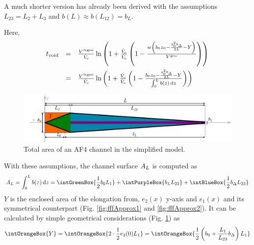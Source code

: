 A much shorter version has already been derived  with the assumptions $L_{23} = L_2 
+ L_3$ and $b(L) \approx b(L_{12}) = b_L$.

Here, 
\begin{equation}
\begin{array}{lll}
\tvoid &= & \frac{\Vappgeo}{\Vc} \ln{
  \left(
  1 + \frac{\Vc}{\Ve}
  \left(
  1 - \frac{
    w 
    \left(
    b_0 z_0 
    - \frac{
      z_0^2 \bDelta
    }{
      2L} 
    - Y
    \right)
  }{\Vgeo}
  \right)
  \right)}
\\\addlinespace
&= &\frac{\Vappgeo}{\Vc} \ln{
  \left(
  1 + \frac{\Vc}{\Ve}
  \left(
  1 - \frac{
    b_0 z_0 
    - \frac{
      z_0^2 \bDelta
    }{
      2L
    } 
    -  Y
  }{
 \int_{0}^{L} b(z) \diff z 
}
  \right)
  \right)}
\end{array}
\end{equation}
\begin{figure}[H]
  \begin{center}
    \includegraphics[width=\linewidth]{./images/fffSimplified.pdf}
    \vspace*{-3ex}    
  \end{center}
  \caption[Total area of an AF4 channel in the simplified model]{
    Total area of an AF4 channel in the simplified model.}
  \label{fig:fffSimplied}
\end{figure}
With these assumptions, the channel surface $A_L$ is computed as
\begin{equation}
\AL = \int_{0}^{L} b(z) \diff z 
= 
\intGreenBox{\ensuremath{\frac{1}{2} b_0 L_1}}
+ 
\intPurpleBox{\ensuremath{\bL L_{23}}}
+
\intBlueBox{\ensuremath{\frac{1}{2} \bDelta L_{23}}}
\end{equation}
$Y$ is the enclosed area of the elongation from,
$e_2(x)$ y-axis and $e_1(x)$ and its symmetrical counterpart 
(Fig. \ref{fig:fffApprox1} and \ref{fig:fffApprox2}). 
It can be calculated by simple geometrical considerations (Fig. \ref{fig:fffSimplied}) as 
\begin{equation}
\intOrangeBox{\ensuremath{Y}} = \intOrangeBox{\ensuremath{ 2 \cdot \frac{1}{2} e_2(0) L_1 }} = 
\intOrangeBox{\ensuremath{ \frac{1}{2}\left( b_0 + \frac{L_1}{L_{23}} \bDelta \right) L_1 }}
\end{equation}


